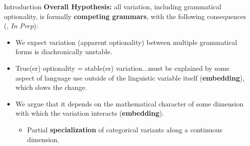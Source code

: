 \documentclass[hyperref={pdfpagelabels=false}]{beamer}
\begin{document}
\begin{frame}{Introduction}
	\textbf{Overall Hypothesis:} all variation, including grammatical optionality, is formally \textbf{competing grammars}, with the following consequences (\citealt{fruehwaldwallenberg2013}, \textsl{In Prep}): \nocite{fruehwaldwallenberginprep}
	\begin{itemize}
		\item We expect variation (apparent optionality) between multiple grammatical forms is diachronically unstable.
		\item True(er) optionality = stable(er) variation...must be explained by some aspect of language use outside of the linguistic variable itself (\textbf{embedding}), which slows the change. 
		\item We argue that it depends on the mathematical character of some dimension with which the variation interacts (\textbf{embedding}).
			\begin{itemize} \item Partial \textbf{specialization} of categorical variants along a continuous dimension. \end{itemize}
	\end{itemize}

\end{frame}
\end{document}
